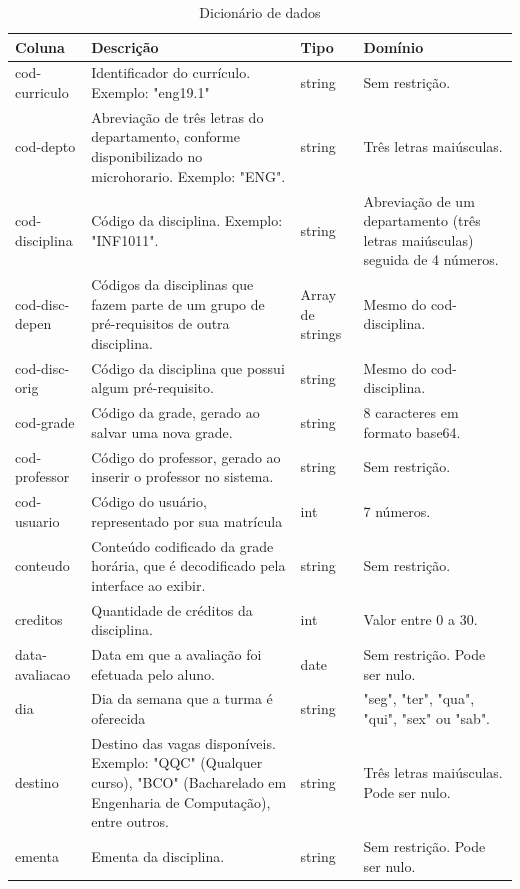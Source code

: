 \begin{longtable}{ | >{\raggedright}m{} | >{\raggedright}m{} | >{\raggedright}m{} | >{\raggedright}m{} | }
    
    \hline\textbf{Coluna} & \textbf{Descrição} & \textbf{Tipo} & \textbf{Domínio}\tabularnewline\hline\hline
    \endhead
    
    \hline\caption{Dicionário de dados}\endlastfoot

    cod-curriculo & Identificador do currículo. Exemplo: "eng19.1" & string & Sem restrição.\tabularnewline\hline
    cod-depto & Abreviação de três letras do departamento, conforme disponibilizado no microhorario. Exemplo: "ENG". & string & Três letras maiúsculas.\tabularnewline\hline
    cod-disciplina & Código da disciplina. Exemplo: "INF1011". & string & Abreviação de um departamento (três letras maiúsculas) seguida de 4 números.\tabularnewline\hline
    cod-disc-depen & Códigos da disciplinas que fazem parte de um grupo de pré-requisitos de outra disciplina. & Array de strings & Mesmo do cod-disciplina.\tabularnewline\hline
    cod-disc-orig & Código da disciplina que possui algum pré-requisito. & string & Mesmo do cod-disciplina.\tabularnewline\hline
    cod-grade & Código da grade, gerado ao salvar uma nova grade. & string & 8 caracteres em formato base64.\tabularnewline\hline
    cod-professor & Código do professor, gerado ao inserir o professor no sistema. & string & Sem restrição.\tabularnewline\hline
    cod-usuario & Código do usuário, representado por sua matrícula & int & 7 números.\tabularnewline\hline
    conteudo & Conteúdo codificado da grade horária, que é decodificado pela interface ao exibir. & string & Sem restrição.\tabularnewline\hline
    creditos & Quantidade de créditos da disciplina. & int & Valor entre 0 a 30.\tabularnewline\hline
    data-avaliacao & Data em que a avaliação foi efetuada pelo aluno. & date & Sem restrição. Pode ser nulo.\tabularnewline\hline
    dia & Dia da semana que a turma é oferecida & string & "seg", "ter", "qua", "qui", "sex" ou "sab".\tabularnewline\hline
    destino & Destino das vagas disponíveis. Exemplo: "QQC" (Qualquer curso), "BCO" (Bacharelado em Engenharia de Computação), entre outros. & string & Três letras maiúsculas. Pode ser nulo.\tabularnewline\hline
    ementa & Ementa da disciplina. & string & Sem restrição. Pode ser nulo.\tabularnewline\hline

\end{longtable}
